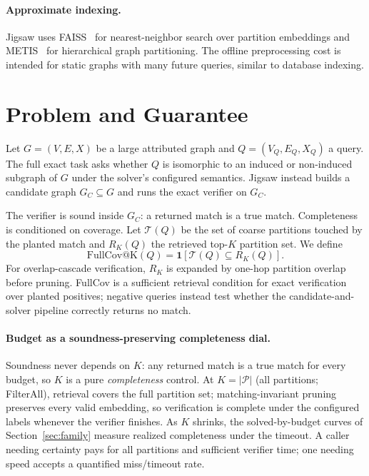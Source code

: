 \documentclass[runningheads]{llncs}
\begin{document}
\paragraph{Approximate indexing.}
Jigsaw uses FAISS~\cite{ref_faiss} for nearest-neighbor search over partition embeddings and METIS~\cite{ref_metis} for hierarchical graph partitioning. The offline preprocessing cost is intended for static graphs with many future queries, similar to database indexing.

\section{Problem and Guarantee}

Let $G=(V,E,X)$ be a large attributed graph and $Q=(V_Q,E_Q,X_Q)$ a query. The full exact task asks whether $Q$ is isomorphic to an induced or non-induced subgraph of $G$ under the solver's configured semantics. Jigsaw instead builds a candidate graph $G_C \subseteq G$ and runs the exact verifier on $G_C$.

The verifier is sound inside $G_C$: a returned match is a true match. Completeness is conditioned on coverage. Let $\mathcal{T}(Q)$ be the set of coarse partitions touched by the planted match and $R_K(Q)$ the retrieved top-$K$ partition set. We define
\begin{equation}
\mathrm{FullCov@K}(Q)=\mathbf{1}\left[\mathcal{T}(Q)\subseteq R_K(Q)\right].
\end{equation}
For overlap-cascade verification, $R_K$ is expanded by one-hop partition overlap before pruning. FullCov is a sufficient retrieval condition for exact verification over planted positives; negative queries instead test whether the candidate-and-solver pipeline correctly returns no match.

\paragraph{Budget as a soundness-preserving completeness dial.}
Soundness never depends on $K$: any returned match is a true match for every budget, so $K$ is a pure \emph{completeness} control. At $K=|\mathcal{P}|$ (all partitions; FilterAll), retrieval covers the full partition set; matching-invariant pruning preserves every valid embedding, so verification is complete under the configured labels whenever the verifier finishes. As $K$ shrinks, the solved-by-budget curves of Section~\ref{sec:family} measure realized completeness under the timeout. A caller needing certainty pays for all partitions and sufficient verifier time; one needing speed accepts a quantified miss/timeout rate.
\end{document}
